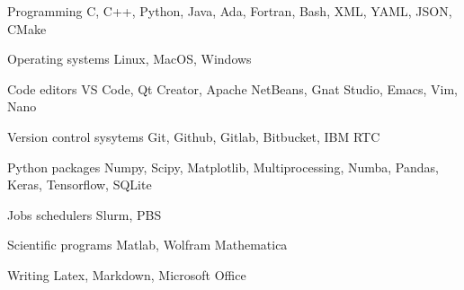 

\begin{cvskills}

    \cvskill
    {Programming} %
    {C, C++, Python, Java, Ada, Fortran, Bash, XML, YAML, JSON, CMake} %

    \cvskill
    {Operating systems} %
    {Linux, MacOS, Windows} %

    \cvskill
    {Code editors} %
    {VS Code, Qt Creator, Apache NetBeans, Gnat Studio, Emacs, Vim, Nano} %

    \cvskill
    {Version control sysytems} %
    {Git, Github, Gitlab, Bitbucket, IBM RTC} %

    
    \cvskill
    {Python packages} %
    {Numpy, Scipy, Matplotlib, Multiprocessing, Numba, Pandas, Keras, Tensorflow, SQLite}

    \cvskill
    {Jobs schedulers} %
    {Slurm, PBS}
    
    \cvskill
    {Scientific programs} %
    {Matlab, Wolfram Mathematica} %

    \cvskill
    {Writing} %
    {Latex, Markdown, Microsoft Office} %

\end{cvskills}
